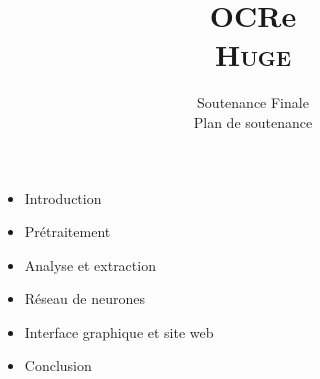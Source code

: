 \documentclass[11pt]{article}
\title{OCRe \\ \textsc{Huge}}
\author{Soutenance Finale \\ Plan de soutenance}
\begin{document}
\maketitle

\begin{itemize}
	\item Introduction
	\item Pr\'etraitement
	\item Analyse et extraction
	\item R\'eseau de neurones
	\item Interface graphique et site web
	\item Conclusion
\end{itemize}
\end{document}
